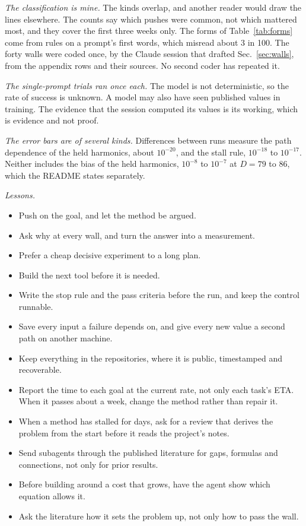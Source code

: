 \documentclass[aps,prd,onecolumn,superscriptaddress,nofootinbib,10pt]{revtex4-2}
\begin{document}
\emph{The classification is mine.} The kinds overlap, and another reader would draw the lines elsewhere. The counts say
which pushes were common, not which mattered most, and they cover the first three weeks only. The forms of
Table~\ref{tab:forms} come from rules on a prompt's first words, which misread about 3 in 100. The forty walls were
coded once, by the Claude session that drafted Sec.~\ref{sec:walls}, from the appendix rows and their sources. No
second coder has repeated it.

\emph{The single-prompt trials ran once each.} The model is not deterministic, so the rate of success is unknown. A
model may also have seen published values in training. The evidence that the session computed its values is its
working, which is evidence and not proof.

\emph{The error bars are of several kinds.} Differences between runs measure the path dependence of the held harmonics,
about $10^{-20}$, and the stall rule, $10^{-18}$ to $10^{-17}$. Neither includes the bias of the held harmonics, $10^{-8}$
to $10^{-7}$ at $D = 79$ to 86, which the README states separately.

\emph{Lessons.}
\begin{itemize}
\item Push on the goal, and let the method be argued.
\item Ask why at every wall, and turn the answer into a measurement.
\item Prefer a cheap decisive experiment to a long plan.
\item Build the next tool before it is needed.
\item Write the stop rule and the pass criteria before the run, and keep the control runnable.
\item Save every input a failure depends on, and give every new value a second path on another machine.
\item Keep everything in the repositories, where it is public, timestamped and recoverable.
\item Report the time to each goal at the current rate, not only each task's ETA. When it passes about a week, change
the method rather than repair it.
\item When a method has stalled for days, ask for a review that derives the problem from the start before it reads the
project's notes.
\item Send subagents through the published literature for gaps, formulas and connections, not only for prior results.
\item Before building around a cost that grows, have the agent show which equation allows it.
\item Ask the literature how it sets the problem up, not only how to pass the wall.
\end{itemize}
\end{document}
